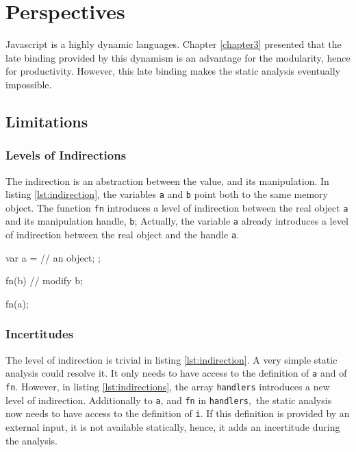 \section{Perspectives}

Javascript is a highly dynamic languages.
Chapter \ref{chapter3} presented that the late binding provided by this dynamism is an advantage for the modularity, hence for productivity.
However, this late binding makes the static analysis eventually impossible.

\subsection{Limitations}

\subsubsection{Levels of Indirections}

The indirection is an abstraction between the value, and its manipulation.
In listing \ref{lst:indirection}, the variables \texttt{a} and \texttt{b} point both to the same memory object.
The function \texttt{fn} introduces a level of indirection between the real object \texttt{a} and its manipulation handle, \texttt{b};
Actually, the variable \texttt{a} already introduces a level of indirection between the real object and the handle \texttt{a}.

\begin{code}[js,
  caption={One level of Indirection},
  label={lst:indirection}]
var a = {
      // an object;
    };

fn(b) {
  // modify b;
}

fn(a);
\end{code}

\subsubsection{Incertitudes}

The level of indirection is trivial in listing \ref{lst:indirection}.
A very simple static analysis could resolve it.
It only needs to have access to the definition of \texttt{a} and of \texttt{fn}.
However, in listing \ref{lst:indirections}, the array \texttt{handlers} introduces a new level of indirection.
Additionally to \texttt{a}, and \texttt{fn} in \texttt{handlers}, the static analysis now needs to have access to the definition of \texttt{i}.
If this definition is provided by an external input, it is not available statically, hence, it adds an incertitude during the analysis. 


